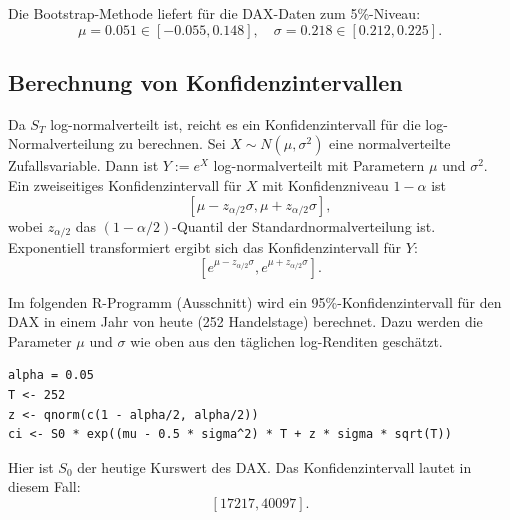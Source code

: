 Die Bootstrap-Methode liefert für die DAX-Daten zum 5\%-Niveau:
$$\mu = 0.051 \in [-0.055, 0.148], \quad \sigma = 0.218 \in [0.212, 0.225].$$


\subsection{Berechnung von Konfidenzintervallen}

Da $S_T$ log-normalverteilt ist, reicht es ein Konfidenzintervall für die log-Normalverteilung
zu berechnen.
Sei $X \sim N(\mu, \sigma^2)$ eine normalverteilte Zufallsvariable.
Dann ist $Y := e^X$ log-normalverteilt mit Parametern $\mu$ und $\sigma^2$.
Ein zweiseitiges Konfidenzintervall für $X$ mit Konfidenzniveau $1-\alpha$ ist
$$[\mu - z_{\alpha/2} \sigma, \mu + z_{\alpha/2} \sigma],$$
wobei $z_{\alpha/2}$ das $(1-\alpha/2)$-Quantil der Standardnormalverteilung ist.
Exponentiell transformiert ergibt sich das Konfidenzintervall für $Y$:
$$[e^{\mu - z_{\alpha/2} \sigma}, e^{\mu + z_{\alpha/2} \sigma}].$$

\begin{bsp}

Im folgenden R-Programm (Ausschnitt) wird ein 95\%-Konfidenzintervall für den DAX in einem Jahr von heute (252 Handelstage) berechnet.
Dazu werden die Parameter $\mu$ und $\sigma$ wie oben aus den täglichen log-Renditen geschätzt.

\begin{lstlisting}
alpha = 0.05
T <- 252
z <- qnorm(c(1 - alpha/2, alpha/2))
ci <- S0 * exp((mu - 0.5 * sigma^2) * T + z * sigma * sqrt(T))
\end{lstlisting}

Hier ist $S_0$ der heutige Kurswert des DAX. Das Konfidenzintervall lautet in diesem Fall:
$$[17217, 40097].$$

\end{bsp}

